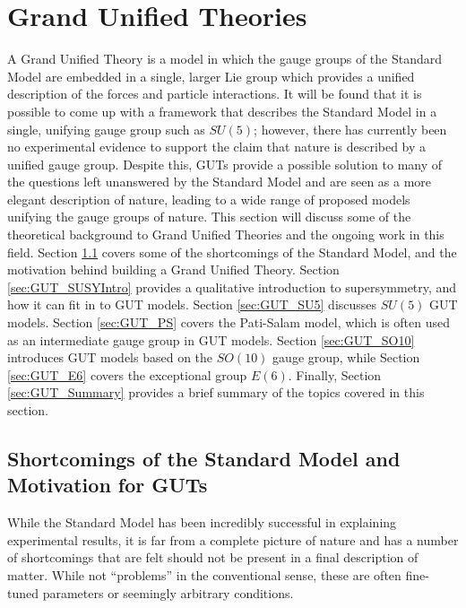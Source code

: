 \documentclass{article}
\begin{document}
\section{Grand Unified Theories}%
\label{sec:GUT}
A Grand Unified Theory is a model in which the gauge groups of the Standard Model are embedded in a single, larger Lie group which provides a unified description of the forces and particle interactions. It will be found that it is possible to come up with a framework that describes the Standard Model in a single, unifying gauge group such as $SU(5)$; however, there has currently been no experimental evidence to support the claim that nature is described by a unified gauge group. Despite this, GUTs provide a possible solution to many of the questions left unanswered by the Standard Model and are seen as a more elegant description of nature, leading to a wide range of proposed models unifying the gauge groups of nature. This section will discuss some of the theoretical background to Grand Unified Theories and the ongoing work in this field.
Section \ref{sec:GUT_SMShortcomings} covers some of the shortcomings of the Standard Model, and the motivation behind building a Grand Unified Theory. Section \ref{sec:GUT_SUSYIntro} provides a qualitative introduction to supersymmetry, and how it can fit in to GUT models. Section \ref{sec:GUT_SU5} discusses $SU(5)$ GUT models. Section \ref{sec:GUT_PS} covers the Pati-Salam model, which is often used as an intermediate gauge group in GUT models. Section \ref{sec:GUT_SO10} introduces GUT models based on the $SO(10)$ gauge group, while Section \ref{sec:GUT_E6} covers the exceptional group $E(6)$. Finally, Section \ref{sec:GUT_Summary} provides a brief summary of the topics covered in this section.

\subsection{Shortcomings of the Standard Model and Motivation for GUTs}%
\label{sec:GUT_SMShortcomings}
While the Standard Model has been incredibly successful in explaining experimental results, it is far from a complete picture of nature and has a number of shortcomings that are felt should not be present in a final description of matter. While not ``problems'' in the conventional sense, these are often fine-tuned parameters or seemingly arbitrary conditions.
\end{document}
